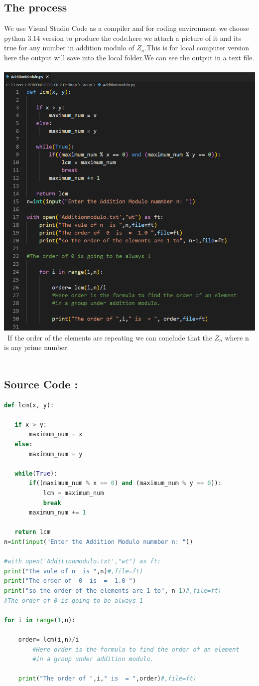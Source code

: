 \documentclass{article}
\begin{document}
\subsection{The process}
We use Visual Studio Code as a compiler and for coding environment we choose python 3.14 version to produce the code.here we attach a picture of it and its true for any number in addition modulo of $Z_n$.This is for local computer version here the output will save into the local folder.We can see the output in a text file.\\\\
\includegraphics[width=.8\linewidth]{abcd.png}\\\
If the order of the elements are repeating we can conclude that the $Z_n$ where n is any prime number.\\\
\subsection{Source Code :}
\begin{lstlisting}[language=Python, caption=Python example]
def lcm(x, y):

   if x > y:
       maximum_num = x
   else:
       maximum_num = y

   while(True):
       if((maximum_num % x == 0) and (maximum_num % y == 0)):
           lcm = maximum_num
           break
       maximum_num += 1

   return lcm
n=int(input("Enter the Addition Modulo nummber n: "))

#with open('Additionmodulo.txt',"wt") as ft:
print("The vule of n  is ",n)#,file=ft)
print("The order of  0  is  =  1.0 ")
print("so the order of the elements are 1 to", n-1)#,file=ft)
#The order of 0 is going to be always 1

for i in range(1,n):

    order= lcm(i,n)/i 
        #Here order is the formula to find the order of an element 
        #in a group under addition modulo.
    
    print("The order of ",i," is  = ",order)#,file=ft)
    


    
\end{lstlisting}
\end{document}
